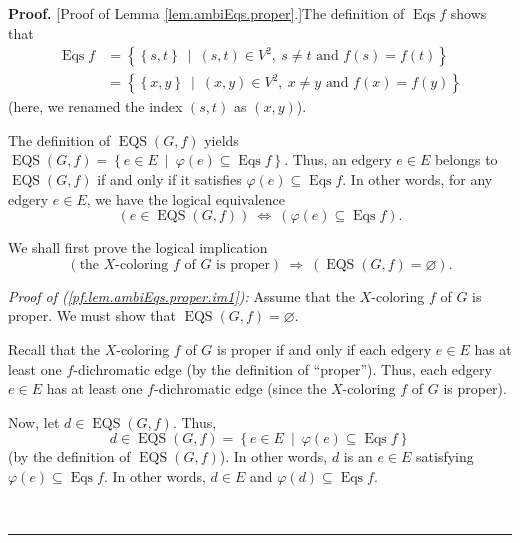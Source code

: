 \documentclass[numbers=enddot,12pt,final,onecolumn,notitlepage]{scrartcl}%
\theoremstyle{definition}
\newenvironment{proof}[1][Proof]{\noindent\textbf{#1.} }{\ \rule{0.5em}{0.5em}}
\newenvironment{verlong}{}{}
\begin{document}
\begin{verlong}
\begin{proof}
[Proof of Lemma \ref{lem.ambiEqs.proper}.]The definition of
$\operatorname*{Eqs}f$ shows that%
\begin{align}
\operatorname*{Eqs}f  &  =\left\{  \left\{  s,t\right\}  \ \mid\ \left(
s,t\right)  \in V^{2},\ s\neq t\text{ and }f\left(  s\right)  =f\left(
t\right)  \right\} \nonumber\\
&  =\left\{  \left\{  x,y\right\}  \ \mid\ \left(  x,y\right)  \in
V^{2},\ x\neq y\text{ and }f\left(  x\right)  =f\left(  y\right)  \right\}
\label{pf.lem.ambiEqs.proper.0}%
\end{align}
(here, we renamed the index $\left(  s,t\right)  $ as $\left(  x,y\right)  $).

The definition of $\operatorname*{EQS}\left(  G,f\right)  $ yields
$\operatorname*{EQS}\left(  G,f\right)  =\left\{  e\in E\ \mid\ \varphi\left(
e\right)  \subseteq\operatorname*{Eqs}f\right\}  $. Thus, an edgery $e\in E$
belongs to $\operatorname*{EQS}\left(  G,f\right)  $ if and only if it
satisfies $\varphi\left(  e\right)  \subseteq\operatorname*{Eqs}f$. In other
words, for any edgery $e\in E$, we have the logical equivalence%
\begin{equation}
\left(  e\in\operatorname*{EQS}\left(  G,f\right)  \right)
\ \Longleftrightarrow\ \left(  \varphi\left(  e\right)  \subseteq
\operatorname*{Eqs}f\right)  . \label{pf.lem.ambiEqs.proper.EQS}%
\end{equation}


We shall first prove the logical implication%
\begin{equation}
\left(  \text{the }X\text{-coloring }f\text{ of }G\text{ is proper}\right)
\ \Longrightarrow\ \left(  \operatorname*{EQS}\left(  G,f\right)
=\varnothing\right)  . \label{pf.lem.ambiEqs.proper.im1}%
\end{equation}


\textit{Proof of (\ref{pf.lem.ambiEqs.proper.im1}):} Assume that the
$X$-coloring $f$ of $G$ is proper. We must show that $\operatorname*{EQS}%
\left(  G,f\right)  =\varnothing$.

Recall that the $X$-coloring $f$ of $G$ is proper if and only if each edgery
$e\in E$ has at least one $f$-dichromatic edge (by the definition of
\textquotedblleft proper\textquotedblright). Thus, each edgery $e\in E$ has at
least one $f$-dichromatic edge (since the $X$-coloring $f$ of $G$ is proper).

Now, let $d\in\operatorname*{EQS}\left(  G,f\right)  $. Thus,%
\[
d\in\operatorname*{EQS}\left(  G,f\right)  =\left\{  e\in E\ \mid
\ \varphi\left(  e\right)  \subseteq\operatorname*{Eqs}f\right\}
\]
(by the definition of $\operatorname*{EQS}\left(  G,f\right)  $). In other
words, $d$ is an $e\in E$ satisfying $\varphi\left(  e\right)  \subseteq
\operatorname*{Eqs}f$. In other words, $d\in E$ and $\varphi\left(  d\right)
\subseteq\operatorname*{Eqs}f$.


\end{proof}
\end{verlong}
\end{document}
